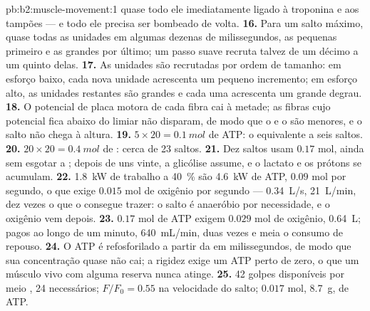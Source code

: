 \begin{solution}{pb:b2:muscle-movement:1}
quase todo ele imediatamente ligado à troponina e aos tampões --- e todo
ele precisa ser bombeado de volta.
\textbf{16.} Para um salto máximo, quase todas as unidades em algumas
dezenas de milissegundos, as pequenas primeiro e as grandes por último;
um passo suave recruta talvez de um décimo a um quinto delas.
\textbf{17.} As unidades são recrutadas por ordem de tamanho: em esforço
baixo, cada nova unidade acrescenta um pequeno incremento; em esforço
alto, as unidades restantes são grandes e cada uma acrescenta um grande
degrau.
\textbf{18.} O potencial de placa motora de cada fibra cai à metade; as
fibras cujo potencial fica abaixo do limiar não disparam, de modo que o
 e o  são menores, e o salto não chega à altura.
\textbf{19.} $5\times 20 = \qty{0.1}{mol}$ de ATP: o equivalente a seis
saltos.
\textbf{20.} $20\times 20 = \qty{0.4}{mol}$ de : cerca de
23 saltos.
\textbf{21.} Dez saltos usam $0.17$ mol, ainda sem esgotar a
; depois de uns vinte, a glicólise assume, e o lactato e
os prótons se acumulam.
\textbf{22.} \qty{1.8}{kW} de trabalho a \qty{40}{\%} são \qty{4.6}{kW}
de ATP, $0.09$ mol por segundo, o que exige $0.015$ mol de oxigênio por
segundo --- \qty{0.34}{L/s}, \qty{21}{L/min}, dez vezes o que o 
consegue trazer: o salto é anaeróbio por necessidade, e o oxigênio vem
depois.
\textbf{23.} $0.17$ mol de ATP exigem $0.029$ mol de oxigênio,
\qty{0.64}{L}; pagos ao longo de um minuto, \qty{640}{mL/min}, duas
vezes e meia o consumo de repouso.
\textbf{24.} O ATP é refosforilado a partir da  em
milissegundos, de modo que sua concentração quase não cai; a rigidez
exige um ATP perto de zero, o que um músculo vivo com alguma reserva
nunca atinge.
\textbf{25.} 42 golpes disponíveis por meio , 24 necessários;
$F/F_0 = 0.55$ na velocidade do salto; $0.017$ mol, \qty{8.7}{g}, de
ATP.
\end{solution}
